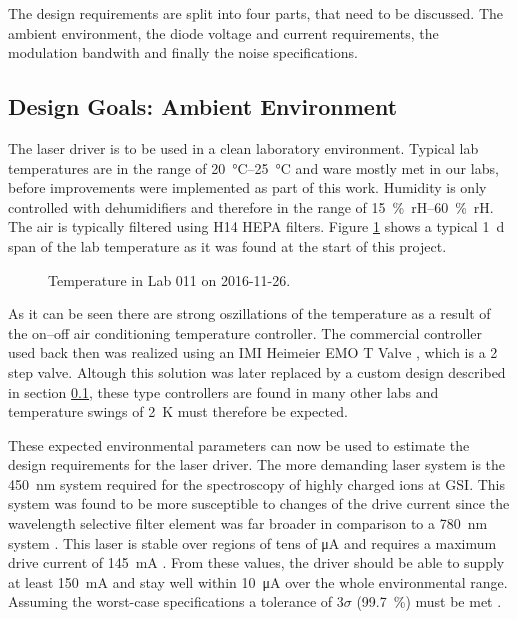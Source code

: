 The design requirements are split into four parts, that need to be discussed. The ambient environment, the diode voltage and current requirements, the modulation bandwith and finally the noise specifications.

\clearpage
\subsection{Design Goals: Ambient Environment}
The laser driver is to be used in a clean laboratory environment. Typical lab temperatures are in the range of \qtyrange{20}{25}{\celsius} and ware mostly met in our labs, before improvements were implemented as part of this work. Humidity is only controlled with dehumidifiers and therefore in the range of \qtyrange{15}{60}{\percent rH}. The air is typically filtered using H14 HEPA filters. Figure \ref{fig:lab_temperature_start_of_project} shows a typical \qty{1}{d} span of the lab temperature as it was found at the start of this project.

\begin{figure}[ht]
    \centering
    
    \caption{Temperature in Lab 011 on 2016-11-26.}
    \label{fig:lab_temperature_start_of_project}
\end{figure}

As it can be seen there are strong oszillations of the temperature as a result of the on–off air conditioning temperature controller. The commercial controller used back then was realized using an IMI Heimeier EMO T Valve \cite{datasheet_heimeier_emo_t}, which is a 2 step valve. Altough this solution was later replaced by a custom design described in section \ref{}, these type controllers are found in many other labs and temperature swings of \qty{2}{\kelvin} must therefore be expected.

These expected environmental parameters can now be used to estimate the design requirements for the laser driver. The more demanding laser system is the \qty{450}{\nm} system \cite{thesis_baus} required for the spectroscopy of highly charged ions \cite{thesis_alex} at GSI. This system was found to be more susceptible to changes of the drive current since the wavelength selective filter element was far broader in comparison to a \qty{780}{\nm} system \cite{two_filter_paper}. This laser is stable over regions of tens of \unit{\uA} and requires a maximum drive current of \qty{145}{\mA} \cite{datasheet_osram_pl450b}. From these values, the driver should be able to supply at least \qty{150}{\mA} and stay well within \qty{10}{\uA} over the whole environmental range. Assuming the worst-case specifications a tolerance of $3\sigma$ (\qty{99.7}{\percent}) must be met \cite{worst_case_design}.

